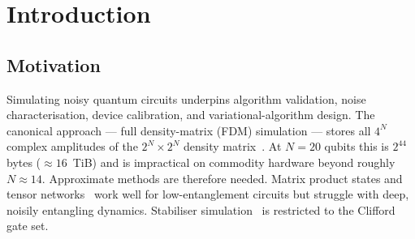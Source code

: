 \documentclass[11pt,a4paper]{article}
\begin{document}
\begin{abstract}
For empirical validation we deliberately constrain claims to \emph{one} tested regime:
a head-to-head comparison against Cirq's \texttt{DensityMatrixSimulator}~\cite{cirq} on
a random dense circuit of depth 13 with per-qubit depolarising noise $p=10^{-3}$, over
$N=4,\ldots,20$ qubits, three trials per point. LRET overtakes Cirq's runtime at
$N\!\ge\!8$ and reaches a $59.1\times$ speedup at $N=14$ with state fidelity
$\ge 0.986$; it completes circuits at $N=16,18$ where the Cirq density-matrix reference
exceeds available RAM (68.7\,GB and 1099.5\,GB required, respectively). Final ranks
stay at or below 152 even at $N=18$ ($0.058\%$ of the full Hilbert dimension), empirically
confirming the low-rank assumption of~\cite{chen2021lret}. All other implementation
subsystems (MPI, GPU, additional parallel modes, QEC, autodiff) have been verified with
smoke and unit tests but are not benchmarked in this report; their performance
characterisation is explicitly deferred to future work. We conclude with the Proxima
AI orchestration system, a Python agent-framework layer that manages the full
clone$\to$build$\to$run$\to$analyse workflow over the LRET simulator and five other
quantum backends.
\end{abstract}

\tableofcontents
\clearpage

\section{Introduction}

\subsection{Motivation}

Simulating noisy quantum circuits underpins algorithm validation, noise characterisation,
device calibration, and variational-algorithm design. The canonical approach --- full
density-matrix (FDM) simulation --- stores all $4^N$ complex amplitudes of the
$2^N \times 2^N$ density matrix~\cite{nielsenchuang2010}. At $N = 20$ qubits this is
$2^{44}$ bytes ($\approx 16$~TiB) and is impractical on commodity hardware beyond roughly
$N \approx 14$. Approximate methods are therefore needed. Matrix product states
and tensor networks~\cite{orus2014tn} work well for low-entanglement circuits but
struggle with deep, noisily entangling dynamics. Stabiliser
simulation~\cite{gottesman1997} is restricted to the Clifford gate set.
\end{document}
